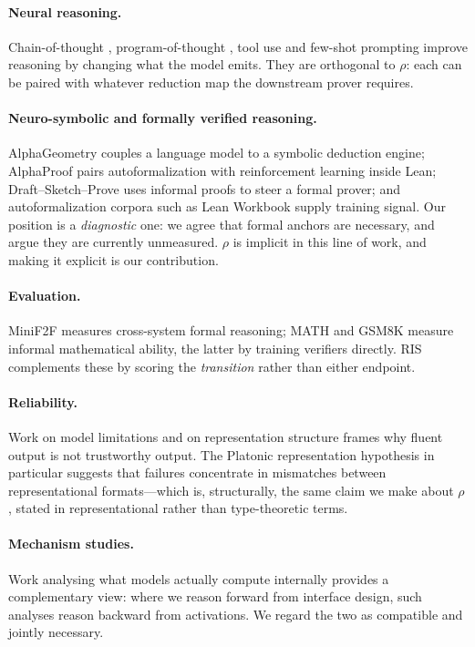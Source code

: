 \documentclass[11pt,a4paper]{article}
\theoremstyle{plain}
\theoremstyle{definition}
\newcommand{\RIS}{\textnormal{\textsc{RIS}}}
\begin{document}
\paragraph{Neural reasoning.} Chain-of-thought \citep{wei2022cot},
program-of-thought \citep{chen2022pot}, tool use \citep{schick2023toolformer}
and few-shot prompting \citep{brown2020} improve reasoning by changing what
the model emits. They are orthogonal to $\rho$: each can be paired with
whatever reduction map the downstream prover requires.

\paragraph{Neuro-symbolic and formally verified reasoning.} AlphaGeometry
\citep{alphageometry2024} couples a language model to a symbolic deduction
engine; AlphaProof \citep{alphaproof2025} pairs autoformalization with
reinforcement learning inside Lean; Draft--Sketch--Prove
\citep{dsp2022} uses informal proofs to steer a formal prover; and
autoformalization corpora such as Lean Workbook \citep{leanworkbook2024}
supply training signal. Our position is a \emph{diagnostic} one: we agree
that formal anchors are necessary, and argue they are currently
unmeasured. $\rho$ is implicit in this line of work, and making it explicit
is our contribution.

\paragraph{Evaluation.} MiniF2F \citep{minif2f2021} measures
cross-system formal reasoning; MATH \citep{hendrycks2021math} and
GSM8K \citep{cobbe2021verifiers} measure informal mathematical ability, the
latter by training verifiers directly. \RIS{} complements these by scoring
the \emph{transition} rather than either endpoint.

\paragraph{Reliability.} Work on model limitations \citep{bender2021parrots}
and on representation structure \citep{huh2024platonic} frames why fluent
output is not trustworthy output. The Platonic representation hypothesis
in particular suggests that failures concentrate in mismatches between
representational formats---which is, structurally, the same claim we make
about $\rho$, stated in representational rather than type-theoretic terms.

\paragraph{Mechanism studies.} Work analysing what models actually compute
internally \citep{kaprison2025physics} provides a complementary view:
where we reason forward from interface design, such analyses reason backward
from activations. We regard the two as compatible and jointly necessary.
\end{document}
